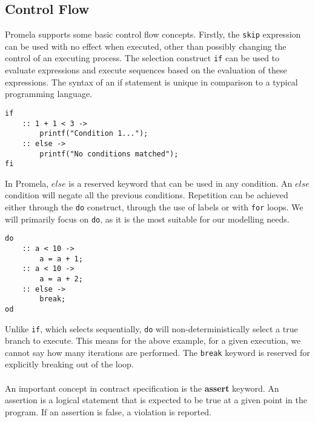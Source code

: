 \subsection{Control Flow}
Promela supports some basic control flow concepts. Firstly, the \texttt{skip} expression can be used with no effect when executed, other than possibly changing the control of an executing process. The selection construct \texttt{if} can be used to evaluate expressions and execute sequences based on the evaluation of these expressions. The syntax of an if statement is unique in comparison to a typical programming language.
\begin{lstlisting}[language=promela, xleftmargin=.3\linewidth]
if
    :: 1 + 1 < 3 ->
        printf("Condition 1...");
    :: else -> 
        printf("No conditions matched");
fi
\end{lstlisting}
In Promela, $else$ is a reserved keyword that can be used in any condition. An $else$ condition will negate all the previous conditions.
Repetition can be achieved either through the \texttt{do} construct, through the use of labels or with \texttt{for} loops. We will primarily focus on \texttt{do}, as it is the most suitable for our modelling needs.
\begin{lstlisting}[language=promela, xleftmargin=.3\linewidth]
do
    :: a < 10 -> 
        a = a + 1;
    :: a < 10 ->
        a = a + 2;
    :: else -> 
        break;
od
\end{lstlisting}
Unlike \texttt{if}, which selects sequentially, \texttt{do} will non-deterministically select a true branch to execute. This means for the above example, for a given execution, we cannot say how many iterations are performed. The \texttt{break} keyword is reserved for explicitly breaking out of the loop.
\\ \\
An important concept in contract specification is the \textbf{assert} keyword. An assertion is a logical statement that is expected to be true at a given point in the program. If an assertion is false, a violation is reported.

